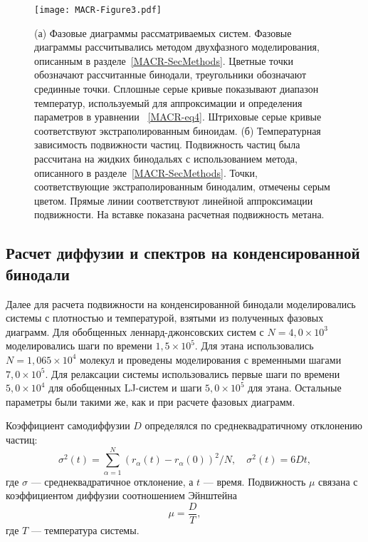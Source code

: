 \begin{figure}[!t]
\centering
 \texttt{[image: MACR-Figure3.pdf]}
 \caption{(а) Фазовые диаграммы рассматриваемых систем. Фазовые диаграммы рассчитывались методом двухфазного моделирования, описанным в разделе~\ref{MACR-SecMethods}. Цветные точки обозначают рассчитанные бинодали, треугольники обозначают срединные точки. Сплошные серые кривые показывают диапазон температур, используемый для аппроксимации и определения параметров в уравнении ~\eqref{MACR-eq4}. Штриховые серые кривые соответствуют экстраполированным биноидам. (б) Температурная зависимость подвижности частиц. Подвижность частиц была рассчитана на жидких бинодальях с использованием метода, описанного в разделе~\ref{MACR-SecMethods}. Точки, соответствующие экстраполированным бинодалим, отмечены серым цветом. Прямые линии соответствуют линейной аппроксимации подвижности. На вставке показана расчетная подвижность метана.}
\label{MACR-Figure3}
\end{figure}

\subsection{Расчет диффузии и спектров на конденсированной бинодали}

Далее для расчета подвижности на конденсированной бинодали моделировались системы с плотностью и температурой, взятыми из полученных фазовых диаграмм.
Для обобщенных леннард-джонсовских систем с $N = 4,0 \times 10 ^ 3$ моделировались шаги по времени $1,5 \times 10 ^ 5$. Для этана использовались $N = 1,065 \times 10 ^ 4 $ молекул и проведены моделирования с временными шагами $ 7,0 \times 10 ^ 5 $. Для релаксации системы использовались первые шаги по времени $ 5,0 \times 10 ^ 4 $ для обобщенных LJ-систем и шаги $ 5,0 \times 10 ^ 5 $ для этана. Остальные параметры были такими же, как и при расчете фазовых диаграмм.

Коэффициент самодиффузии $D$ определялся по среднеквадратичному отклонению частиц:
\begin{equation}
    \sigma^2(t) = \sum\limits_{\alpha = 1}^{N} (r_{\alpha}(t) - r_{\alpha}(0))^2 / N, \quad \sigma^2(t) = 6Dt,
    \label{MACR-eq5}
\end{equation}
где $\sigma$ — среднеквадратичное отклонение, а $t$ — время. Подвижность $\mu$ связана с коэффициентом диффузии соотношением Эйнштейна
\begin{equation}
    \mu = \frac{D}{T},
    \label{MACR-eq6}
\end{equation}
где $T$ — температура системы.

